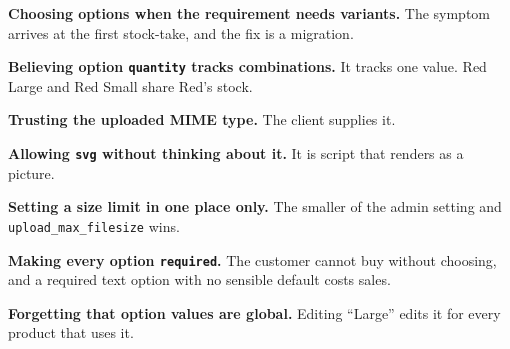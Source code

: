 \begin{pitfall}
\begin{tight}
  \item \textbf{Choosing options when the requirement needs variants.} The
        symptom arrives at the first stock-take, and the fix is a migration.
  \item \textbf{Believing option \texttt{quantity} tracks combinations.} It
        tracks one value. Red Large and Red Small share Red's stock.
  \item \textbf{Trusting the uploaded MIME type.} The client supplies it.
  \item \textbf{Allowing \texttt{svg} without thinking about it.} It is script
        that renders as a picture.
  \item \textbf{Setting a size limit in one place only.} The smaller of the
        admin setting and \texttt{upload\_max\_filesize} wins.
  \item \textbf{Making every option \texttt{required}.} The customer cannot
        buy without choosing, and a required text option with no sensible
        default costs sales.
  \item \textbf{Forgetting that option values are global.} Editing ``Large''
        edits it for every product that uses it.
\end{tight}
\end{pitfall}

